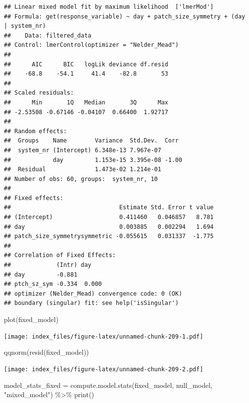 \documentclass[
]{article}
\newenvironment{Shaded}{\begin{snugshade}}{\end{snugshade}}
\newcommand{\FunctionTok}[1]{\textcolor[rgb]{0.00,0.00,0.00}{#1}}
\newcommand{\NormalTok}[1]{#1}
\newcommand{\OtherTok}[1]{\textcolor[rgb]{0.56,0.35,0.01}{#1}}
\newcommand{\SpecialCharTok}[1]{\textcolor[rgb]{0.00,0.00,0.00}{#1}}
\newcommand{\StringTok}[1]{\textcolor[rgb]{0.31,0.60,0.02}{#1}}
\begin{document}
\begin{verbatim}
## Linear mixed model fit by maximum likelihood  ['lmerMod']
## Formula: get(response_variable) ~ day + patch_size_symmetry + (day | system_nr)
##    Data: filtered_data
## Control: lmerControl(optimizer = "Nelder_Mead")
## 
##      AIC      BIC   logLik deviance df.resid 
##    -68.8    -54.1     41.4    -82.8       53 
## 
## Scaled residuals: 
##      Min       1Q   Median       3Q      Max 
## -2.53508 -0.67146 -0.04107  0.66400  1.92717 
## 
## Random effects:
##  Groups    Name        Variance  Std.Dev.  Corr 
##  system_nr (Intercept) 6.348e-13 7.967e-07      
##            day         1.153e-15 3.395e-08 -1.00
##  Residual              1.473e-02 1.214e-01      
## Number of obs: 60, groups:  system_nr, 10
## 
## Fixed effects:
##                               Estimate Std. Error t value
## (Intercept)                   0.411460   0.046857   8.781
## day                           0.003885   0.002294   1.694
## patch_size_symmetrysymmetric -0.055615   0.031337  -1.775
## 
## Correlation of Fixed Effects:
##             (Intr) day   
## day         -0.881       
## ptch_sz_sym -0.334  0.000
## optimizer (Nelder_Mead) convergence code: 0 (OK)
## boundary (singular) fit: see help('isSingular')
\end{verbatim}

\begin{Shaded}
\begin{Highlighting}[]
\FunctionTok{plot}\NormalTok{(fixed\_model)}
\end{Highlighting}
\end{Shaded}

\texttt{[image: index\_files/figure-latex/unnamed-chunk-209-1.pdf]}

\begin{Shaded}
\begin{Highlighting}[]
\FunctionTok{qqnorm}\NormalTok{(}\FunctionTok{resid}\NormalTok{(fixed\_model))}
\end{Highlighting}
\end{Shaded}

\texttt{[image: index\_files/figure-latex/unnamed-chunk-209-2.pdf]}

\begin{Shaded}
\begin{Highlighting}[]
\NormalTok{model\_stats\_fixed }\OtherTok{=} \FunctionTok{compute.model.stats}\NormalTok{(fixed\_model,}
\NormalTok{                                              null\_model,}
                                              \StringTok{"mixed\_model"}\NormalTok{) }\SpecialCharTok{\%\textgreater{}\%}
  \FunctionTok{print}\NormalTok{()}
\end{Highlighting}
\end{Shaded}
\end{document}
